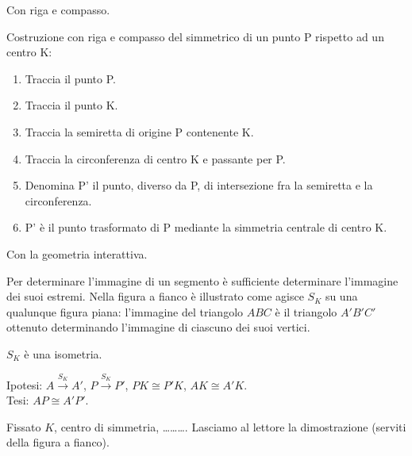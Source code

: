 Con riga e compasso.

\begin{procedura}
  Costruzione con riga e compasso del simmetrico di un punto P rispetto ad un 
centro K:
  \begin{enumerate} [nosep]
    \item 
    Traccia il punto P.
    \item 
    Traccia il punto K.
    \item 
    Traccia la semiretta di origine P contenente K.
    \item 
    Traccia la circonferenza di centro K e passante per P. 
    \item 
    Denomina P' il punto, diverso da P, di intersezione fra la semiretta e la 
circonferenza.  
    \item 
    P' è il punto trasformato di P mediante la simmetria centrale di centro K.
  \end{enumerate}
\end{procedura}

Con la geometria interattiva.


\noindent\begin{minipage}{0.65\textwidth}\parindent15pt
Per determinare l'immagine di un segmento è sufficiente determinare 
l'immagine dei suoi estremi. Nella figura a fianco è illustrato come 
agisce $S_K$ su una qualunque figura piana: l'immagine del triangolo 
$ABC$ è il triangolo $A'B'C'$ ottenuto determinando l'immagine di 
ciascuno dei suoi vertici.
\end{minipage}\hfil
\begin{minipage}{0.35\textwidth}
  \centering
\end{minipage}

\begin{teorema}\label{teo:8.1}
$S_K$ è una isometria.
\end{teorema}

\noindent\begin{minipage}{0.65\textwidth}\parindent15pt
\noindent Ipotesi: $A\overset{S_K}{\rightarrow}A'$, 
$P\overset{S_K}{\rightarrow}P'$, $PK\cong P'K$, $AK\cong A'K$.\\
Tesi: $AP\cong A'P'$.

Fissato $K$, centro di simmetria, \ldots\ldots\ldots{}.
Lasciamo al lettore la dimostrazione (serviti della figura a fianco).
\end{minipage}\hfil
\begin{minipage}{0.35\textwidth}
  \centering
\end{minipage}

